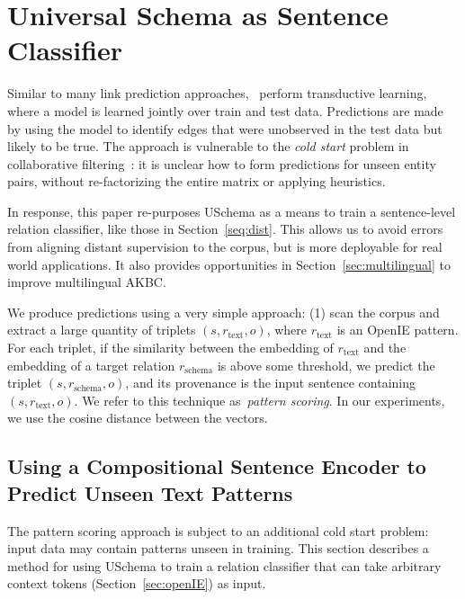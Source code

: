 \section{Universal Schema as Sentence Classifier \label{sec:uschema}}
Similar to many link prediction approaches,~\citep{limin} perform transductive learning, where a model is learned jointly over train and test data. Predictions are made by using the model to identify edges that were unobserved in the test data but likely to be true. The approach is vulnerable to the \emph{cold start} problem in collaborative filtering~\citep{schein2002methods}: it is unclear how to form predictions for unseen entity pairs, without re-factorizing the entire matrix or applying heuristics. 

In response, this paper re-purposes USchema as a means to train a sentence-level relation classifier, like those in Section~\ref{seq:dist}. This allows us to avoid errors from aligning distant supervision to the corpus, but is more deployable for real world applications. It also provides opportunities in Section~\ref{sec:multilingual} to improve multilingual AKBC.

We produce predictions using a very simple approach: (1) scan the corpus and extract a large quantity of triplets $(s,r_{\text{text}},o)$, where $r_{\text{text}}$ is an OpenIE pattern. For each triplet, if the similarity between the embedding of $r_{\text{text}}$ and the embedding of a target relation $r_{\text{schema}}$ is above some threshold, we predict the triplet $(s,r_{\text{schema}},o)$, and its provenance is the input sentence containing $(s,r_{\text{text}},o)$. We refer to this technique as~\textit{pattern scoring}. In our experiments, we use the cosine distance between the vectors.



\subsection{Using a Compositional Sentence Encoder to Predict Unseen Text Patterns \label{sec:encoder}}
The pattern scoring approach is subject to an additional cold start problem: input data may contain patterns unseen in training. This section describes a method for using USchema to train a relation classifier that can take arbitrary context tokens (Section~\ref{sec:openIE}) as input.

